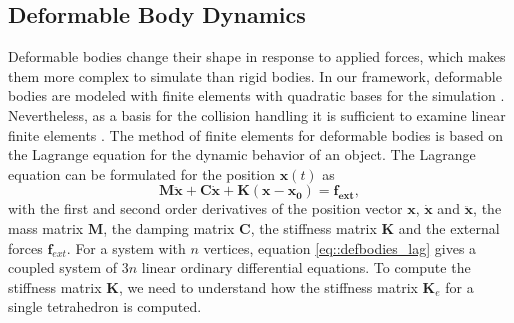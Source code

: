 \subsection{Deformable Body Dynamics}
\label{sec:DeformaleBodyDynamics}
Deformable bodies change their shape in response to applied forces, which makes them more complex to simulate than rigid bodies. In our framework, deformable bodies are modeled with finite elements with quadratic bases for the simulation \cite{WEBER2011}. Nevertheless, as a basis for the collision handling it is sufficient to examine linear finite elements \cite{MUELLER2004}.
The method of finite elements for deformable bodies is based on the Lagrange equation for the dynamic behavior of an object. The Lagrange equation can be formulated for the position $\mathbf x(t)$ as
\begin{equation}
\label{eq::defbodies_lag}
\mathbf {M}\ddot{\mathbf{x}}+\mathbf{C}\dot{ \mathbf{x}}+\mathbf{K(x-x_0)=f_{ext}},
\end{equation}
with the first and second order derivatives of the position vector $\mathbf x$, $\dot {\mathbf x}$ and $\ddot {\mathbf x}$, the mass matrix $\mathbf M$, the damping matrix $\mathbf C$, the stiffness matrix $\mathbf K$ and the external forces $\mathbf f_{ext}$. For a system with $n$ vertices, equation \ref{eq::defbodies_lag} gives a coupled system of $3n$ linear ordinary differential equations.
To compute the stiffness matrix $\mathbf K$, we need to understand how the stiffness matrix $\mathbf K_e$ for a single tetrahedron is computed.

